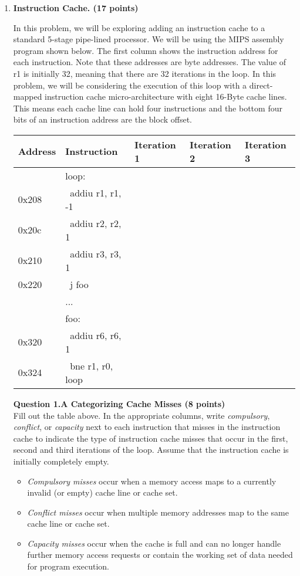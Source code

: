 \documentclass[a4paper,10pt]{article}
\begin{document}
\begin{enumerate}

\item \textbf{Instruction Cache. (17 points)}

In this problem, we will be exploring adding an instruction cache to a standard 5-stage pipe-lined processor. We will be using the MIPS assembly program shown below. The first column shows the instruction address for each instruction. Note that these addresses are byte addresses. The value of r1 is initially 32, meaning that there are 32 iterations in the loop. In this problem, we will be considering the execution of this loop with a direct-mapped instruction cache micro-architecture with eight 16-Byte cache lines. This means each cache line can hold four instructions and the bottom four bits of an instruction address are the block offset.

\begin{center}
\begin{tabular}{lllll}
\toprule  
\textbf{Address} & \textbf{Instruction} & \textbf{Iteration 1} & \textbf{Iteration 2} & \textbf{Iteration 3} \\
\midrule
&loop:&&&\\
\midrule
0x208& \ addiu r1, r1, -1&&&\\
\midrule
0x20c& \ addiu r2, r2, 1&&&\\
\midrule
0x210& \ addiu r3, r3, 1&&&\\
\midrule
0x220& \ j foo&&&\\
\midrule
&...&&&\\
\midrule
&foo:&&&\\
\midrule
0x320& \ addiu r6, r6, 1&&&\\
\midrule
0x324& \ bne r1, r0, loop&&&\\
\bottomrule
\end{tabular}
\end{center}


\textbf{Question 1.A Categorizing Cache Misses (8 points)}\\
Fill out the table above. In the appropriate columns, write \textit{compulsory}, \textit{conflict}, or \textit{capacity} next to each instruction that misses in the instruction cache to indicate the type of instruction cache misses that occur in the first, second and third iterations of the loop. Assume that the instruction cache is initially completely empty.
\begin{itemize}
    \item \textit{Compulsory misses} occur when a memory access maps to a currently invalid (or empty) cache line or cache set.
    \item \textit{Conflict misses} occur when multiple memory addresses map to the same cache line or cache set.
    \item \textit{Capacity misses} occur when the cache is full and can no longer handle further memory access requests or contain the working set of data needed for program execution.
\end{itemize}





\end{enumerate}
\end{document}
